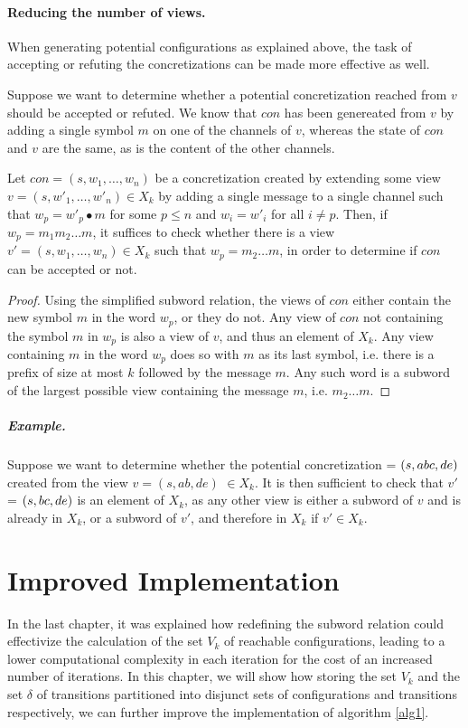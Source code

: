 \paragraph{Reducing the number of views.}
When generating potential configurations as explained above, the task of accepting or refuting the concretizations can be made more effective as well.

Suppose we want to determine whether a potential concretization  reached from $v$ should be accepted or refuted. We know that $con$ has been genereated from $v$ by adding a single symbol $m$ on one of the channels of $v$, whereas the state of $con$ and $v$ are the same, as is the content of the other channels.

\begin{lemma}
Let $con = (s, w_1, \ldots, w_n)$ be a concretization created by extending some view $v = (s, w'_1, \ldots, w'_n) \in X_k$ by adding a single message to a single channel such that $w_p = w'_p \bullet m$ for some $p\leq n$ and $w_i = w'_i$ for all $i \neq p$. Then, if $w_p = m_1 m_2 \ldots m$, it suffices to check whether there is a view $v' = (s, w_1, \ldots, w_n) \in X_k$ such that $w_p = m_2\ldots m$, in order to determine if $con$ can be accepted or not.
\end{lemma}

\begin{proof}
Using the simplified subword relation, the views of $con$ either contain the new symbol $m$ in the word $w_p$, or they do not. Any view of $con$ not containing the symbol $m$ in $w_p$ is also a view of $v$, and thus an element of $X_k$. Any view containing $m$ in the word $w_p$ does so with $m$ as its last symbol, i.e. there is a prefix of size at most $k$ followed by the message $m$. Any such word is a subword of the largest possible view containing the message $m$, i.e. $m_2\ldots m$.

\end{proof}


\subparagraph{Example.} Suppose we want to determine whether the potential concretization  = $(s, abc, de)$ created from the view $v = (s, ab, de)$ $\in X_k$. It is then sufficient to check that $v'$ = $(s,bc,de)$ is an element of $X_k$, as any other view is either a subword of $v$ and is already in $X_k$, or a subword of $v'$, and therefore in $X_k$ if $v' \in X_k$.

\newpage
\newpage
\section{Improved Implementation}
In the last chapter, it was explained how redefining the subword relation could effectivize the calculation of the set $V_k$ of reachable configurations, leading to a lower computational complexity in each iteration for the cost of an increased number of iterations. In this chapter, we will show how storing the set $V_k$ and the set $\delta$ of transitions partitioned into disjunct sets of configurations and transitions respectively, we can further improve the implementation of algorithm \ref{alg1}.

